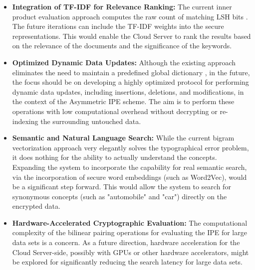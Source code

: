 \begin{itemize}
    \item \textbf{Integration of TF-IDF for Relevance Ranking:} The current inner product evaluation approach computes the raw count of matching LSH bits \cite{wang2014privacy}.%
    The future iterations can include the TF-IDF weights into the secure representations. This would enable the Cloud Server to rank the results based on the relevance of the documents and the significance of the keywords.
    
    \item \textbf{Optimized Dynamic Data Updates:} Although the existing approach eliminates the need to maintain a predefined global dictionary \cite{wang2014privacy},%
    in the future, the focus should be on developing a highly optimized protocol for performing dynamic data updates, including insertions, deletions, and modifications, in the context of the Asymmetric IPE scheme. The aim is to perform these operations with low computational overhead without decrypting or re-indexing the surrounding untouched data.%
    
    \item \textbf{Semantic and Natural Language Search:} While the current bigram vectorization approach very elegantly solves the typographical error problem, it does nothing for the ability to actually understand the concepts. Expanding the system to incorporate the capability for real semantic search, via the incorporation of secure word embeddings (such as Word2Vec), would be a significant step forward. This would allow the system to search for synonymous concepts (such as "automobile" and "car") directly on the encrypted data.
    
    \item \textbf{Hardware-Accelerated Cryptographic Evaluation:} The computational complexity of the bilinear pairing operations for evaluating the IPE for large data sets is a concern. As a future direction, hardware acceleration for the Cloud Server-side, possibly with GPUs or other hardware accelerators, might be explored for significantly reducing the search latency for large data sets.
\end{itemize}